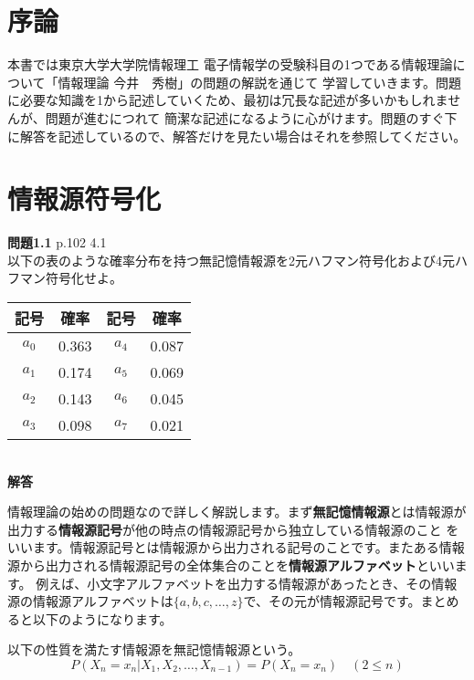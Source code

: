 \documentclass{jlreq}
\begin{document}
\section{序論}
本書では東京大学大学院情報理工 電子情報学の受験科目の1つである情報理論について「情報理論 今井　秀樹」の問題の解説を通じて
学習していきます。問題に必要な知識を1から記述していくため、最初は冗長な記述が多いかもしれませんが、問題が進むにつれて
簡潔な記述になるように心がけます。問題のすぐ下に解答を記述しているので、解答だけを見たい場合はそれを参照してください。
\section{情報源符号化}
\begin{problem}
	\textbf{問題1.1} p.102 4.1 \\
	以下の表のような確率分布を持つ無記憶情報源を2元ハフマン符号化および4元ハフマン符号化せよ。 \\

	\begin{center}
		\begin{tabular}{|c|c|c|c|}
			\hline
			記号 & 確率 & 記号 & 確率 \\
			\hline
			$a_0$ & 0.363 & $a_4$ & 0.087 \\
			\hline
			$a_1$ & 0.174 & $a_5$ & 0.069 \\
			\hline
			$a_2$ & 0.143 & $a_6$ & 0.045 \\
			\hline
			$a_3$ & 0.098 & $a_7$ & 0.021 \\
			\hline
		\end{tabular}
	\end{center}
	\vspace{0.5cm}
	\dotfill \\
	\textbf{解答} \\
\end{problem}
情報理論の始めの問題なので詳しく解説します。まず\textbf{無記憶情報源}とは情報源が出力する\textbf{情報源記号}が他の時点の情報源記号から独立している情報源のこと
をいいます。情報源記号とは情報源から出力される記号のことです。またある情報源から出力される情報源記号の全体集合のことを\textbf{情報源アルファベット}といいます。
例えば、小文字アルファベットを出力する情報源があったとき、その情報源の情報源アルファベットは$\{a, b, c, \ldots, z\}$で、その元が情報源記号です。まとめると以下のようになります。

\begin{theorembox}[無記憶情報源]
	以下の性質を満たす情報源を無記憶情報源という。
	\begin{equation*}
		P(X_n = x_n | X_1, X_2, \ldots, X_{n-1}) = P(X_n = x_n) \quad (2 \leq n)
	\end{equation*}
\end{theorembox}
\end{document}

